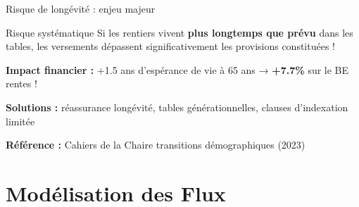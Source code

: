 \documentclass[10pt,aspectratio=169]{beamer}
\newcommand{\highlight}[1]{\textbf{\color{rougeactu}#1}}
\begin{document}
\begin{frame}{Risque de longévité : enjeu majeur}
\begin{alertblock}{Risque systématique}
Si les rentiers vivent \textbf{plus longtemps que prévu} dans les tables, les versements dépassent significativement les provisions constituées !
\end{alertblock}

\begin{center}
\end{center}

\textbf{Impact financier :} +1.5 ans d'espérance de vie à 65 ans → \highlight{+7.7\%} sur le BE rentes !

\textbf{Solutions :} réassurance longévité, tables générationnelles, clauses d'indexation limitée

\textbf{Référence :} Cahiers de la Chaire transitions démographiques (2023)
\end{frame}

\section{Modélisation des Flux}
\end{document}

